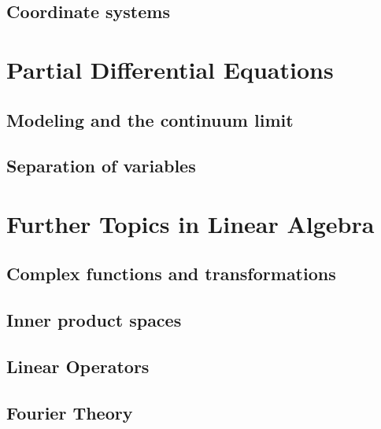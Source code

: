 \documentclass[12pt,letterpaper, openany]{book} %
\begin{document}
\chapter{Coordinate systems}



\part{Partial Differential Equations}
\chapter{Modeling and the continuum limit}


\chapter{Separation of variables}



\part{Further Topics in Linear Algebra}
\chapter{Complex functions and transformations}
 

\chapter{Inner product spaces}


\chapter{Linear Operators}


\chapter{Fourier Theory}



 
\newenvironment{changemargin}[1]{%
\begin{list}{}{%
\setlength{\topsep}{#1}
\setlength{\listparindent}{\parindent}%
\setlength{\itemindent}{\parindent}%
\setlength{\parsep}{\parskip}%
}%
\item[]}{\end{list}}

\begin{changemargin}{3cm}
\printindex 
\end{changemargin}

 
\end{document}
